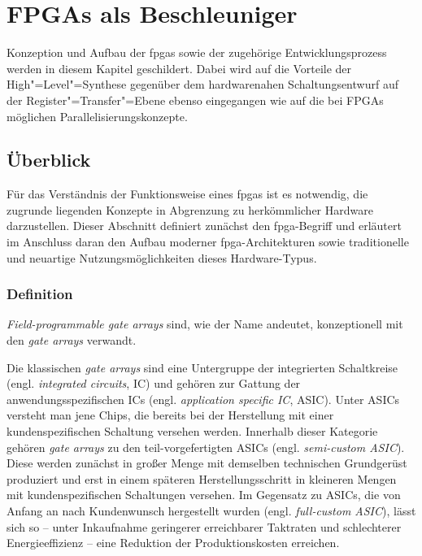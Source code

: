 \chapter{FPGAs als Beschleuniger}\label{fpga}

Konzeption und Aufbau der \gls{fpga}s sowie der zugehörige Entwicklungsprozess
werden in diesem Kapitel geschildert. Dabei wird auf die Vorteile der
High"=Level"=Synthese gegenüber dem hardwarenahen Schaltungsentwurf auf der
Register"=Transfer"=Ebene ebenso eingegangen wie auf die bei FPGAs möglichen
Parallelisierungskonzepte.

\section{Überblick}\label{fpga:ueberblick}

Für das Verständnis der Funktionsweise eines \gls{fpga}s ist es notwendig, die
zugrunde liegenden Konzepte in Abgrenzung zu herkömmlicher Hardware
darzustellen. Dieser Abschnitt definiert zunächst den \gls{fpga}-Begriff und
erläutert im Anschluss daran den Aufbau moderner \gls{fpga}-Architekturen sowie
traditionelle und neuartige Nutzungsmöglichkeiten dieses Hardware-Typus.

\subsection{Definition}\label{fpga:ueberblick:definition}

\textit{Field-programmable gate arrays} sind, wie der Name andeutet,
konzeptionell mit den \textit{gate arrays} verwandt.

Die klassischen \textit{gate arrays} sind eine Untergruppe der integrierten
Schaltkreise (engl. \textit{integrated circuits}, IC) und gehören zur Gattung
der anwendungsspezifischen ICs (engl. \textit{application specific IC}, ASIC).
Unter ASICs versteht man jene Chips, die bereits bei der Herstellung mit einer
kundenspezifischen Schaltung versehen werden. Innerhalb dieser Kategorie gehören
\textit{gate arrays} zu den teil-vorgefertigten ASICs (engl.
\textit{semi-custom ASIC}). Diese werden zunächst in großer Menge mit demselben
technischen Grundgerüst produziert und erst in einem späteren
Herstellungsschritt in kleineren Mengen mit kundenspezifischen Schaltungen
versehen. Im Gegensatz zu ASICs, die von Anfang an nach Kundenwunsch hergestellt
wurden (engl. \textit{full-custom ASIC}), lässt sich so -- unter Inkaufnahme
geringerer erreichbarer Taktraten und schlechterer Energieeffizienz -- eine
Reduktion der Produktionskosten erreichen. \cite[vgl.][123]{kesel2013}

